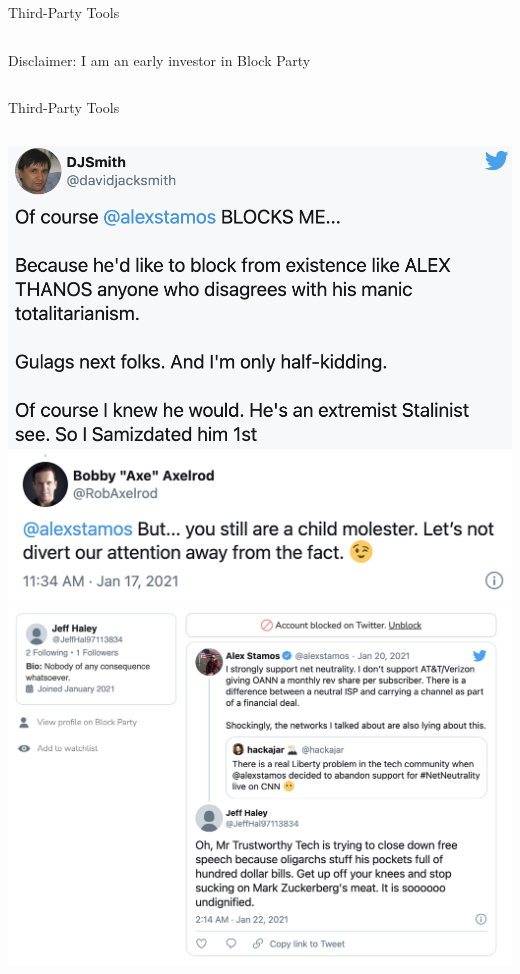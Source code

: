 \documentclass[nobackground,dvipsnames,table]{beamer}
\begin{document}
\begin{frame}{Third-Party Tools}
\begin{columns}[T]
            Disclaimer: I am an early investor in Block Party
    \end{columns}
\end{frame}

\begin{frame}{Third-Party Tools}
    \begin{columns}
            \includegraphics[width=\textwidth]{blocked-by-stamos}
            \includegraphics[width=\textwidth]{blocked-by-stamos-3}
            \includegraphics[width=\textwidth]{blocked-by-stamos-2}

\end{columns}
\end{frame}
\end{document}
